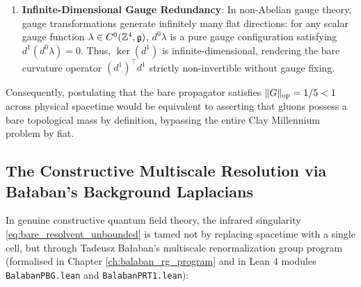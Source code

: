 \begin{warning}
\begin{enumerate}
    \item \textbf{Infinite-Dimensional Gauge Redundancy}: In non-Abelian gauge theory, gauge transformations generate infinitely many flat directions: for any scalar gauge function $\lambda \in C^0(\mathbb{Z}^4, \mathfrak{g})$, $d^0 \lambda$ is a pure gauge configuration satisfying $d^1(d^0 \lambda) = 0$. Thus, $\ker(d^1)$ is infinite-dimensional, rendering the bare curvature operator $(d^1)^\top d^1$ strictly non-invertible without gauge fixing.
\end{enumerate}
Consequently, postulating that the bare propagator satisfies $\|G\|_{\mathrm{op}} = 1/5 < 1$ across physical spacetime would be equivalent to asserting that gluons possess a bare topological mass by definition, bypassing the entire Clay Millennium problem by fiat.
\end{warning}

\subsection{The Constructive Multiscale Resolution via Ba\l aban's Background Laplacians}
\label{subsec:balaban_greens_resolution}

In genuine constructive quantum field theory, the infrared singularity \eqref{eq:bare_resolvent_unbounded} is tamed not by replacing spacetime with a single cell, but through Tadeusz Ba\l aban's multiscale renormalization group program \cite{Balaban1984,Balaban1985,Balaban1987,Balaban1988} (formalised in Chapter \ref{ch:balaban_rg_program} and in Lean 4 modules \texttt{BalabanPBG.lean} and \texttt{BalabanPRT1.lean}):

